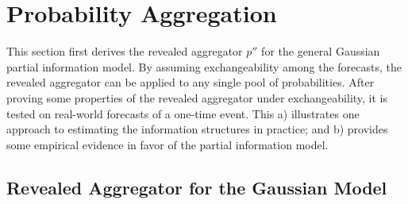 \documentclass[11pt]{article}
\theoremstyle{definition}
\theoremstyle{definition}
\begin{document}
\section{Probability Aggregation}
\label{aggregation}

This section first derives the revealed aggregator $p''$ for the
general Gaussian partial information model. By assuming
exchangeability among the forecasts, the revealed aggregator can be
applied to any single pool of probabilities. After proving some
properties of the revealed aggregator under exchangeability, it is
tested on real-world forecasts of a one-time event. This a)
illustrates one approach to estimating the information structures in
practice; and b) provides some empirical evidence in favor of the
partial information model.

\subsection{Revealed Aggregator for the Gaussian Model}
\end{document}
